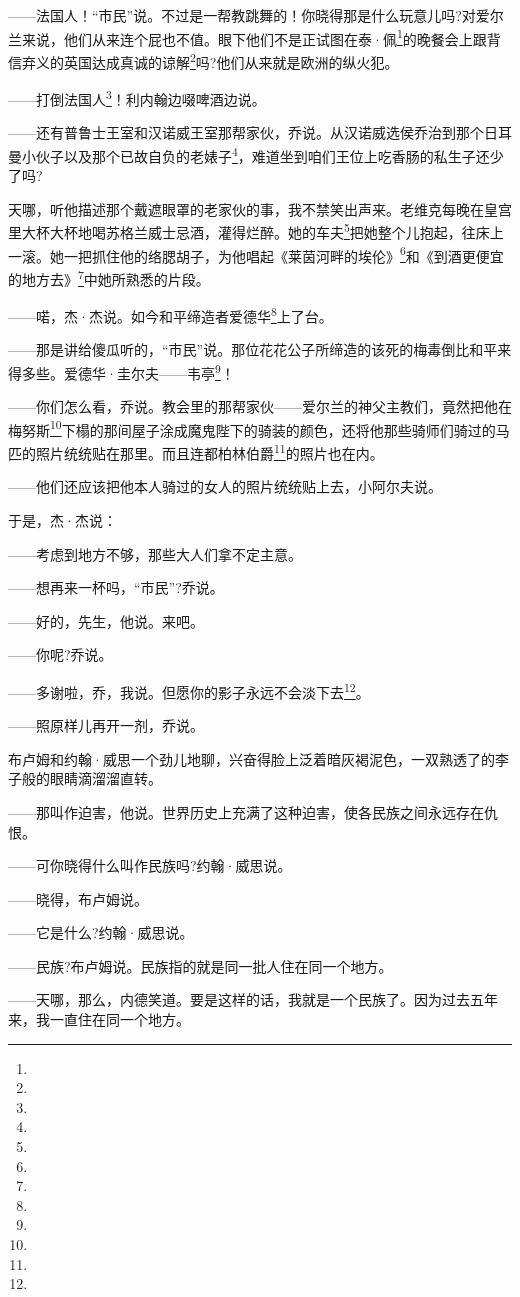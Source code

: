 \par ——法国人！“市民”说。不过是一帮教跳舞的！你晓得那是什么玩意儿吗?对爱尔兰来说，他们从来连个屁也不值。眼下他们不是正试图在泰·佩\footnote{}的晚餐会上跟背信弃义的英国达成真诚的谅解\footnote{}吗?他们从来就是欧洲的纵火犯。
\par ——打倒法国人\footnote{}！利内翰边啜啤酒边说。
\par ——还有普鲁士王室和汉诺威王室那帮家伙，乔说。从汉诺威选侯乔治到那个日耳曼小伙子以及那个已故自负的老婊子\footnote{}，难道坐到咱们王位上吃香肠的私生子还少了吗?
\par 天哪，听他描述那个戴遮眼罩的老家伙的事，我不禁笑出声来。老维克每晚在皇宫里大杯大杯地喝苏格兰威士忌酒，灌得烂醉。她的车夫\footnote{}把她整个儿抱起，往床上一滚。她一把抓住他的络腮胡子，为他唱起《莱茵河畔的埃伦》\footnote{}和《到酒更便宜的地方去》\footnote{}中她所熟悉的片段。
\par ——喏，杰·杰说。如今和平缔造者爱德华\footnote{}上了台。
\par ——那是讲给傻瓜听的，“市民”说。那位花花公子所缔造的该死的梅毒倒比和平来得多些。爱德华·圭尔夫——韦亭\footnote{}！
\par ——你们怎么看，乔说。教会里的那帮家伙——爱尔兰的神父主教们，竟然把他在梅努斯\footnote{}下榻的那间屋子涂成魔鬼陛下的骑装的颜色，还将他那些骑师们骑过的马匹的照片统统贴在那里。而且连都柏林伯爵\footnote{}的照片也在内。
\par ——他们还应该把他本人骑过的女人的照片统统贴上去，小阿尔夫说。
\par 于是，杰·杰说：
\par ——考虑到地方不够，那些大人们拿不定主意。
\par ——想再来一杯吗，“市民”?乔说。
\par ——好的，先生，他说。来吧。
\par ——你呢?乔说。
\par ——多谢啦，乔，我说。但愿你的影子永远不会淡下去\footnote{}。
\par ——照原样儿再开一剂，乔说。
\par 布卢姆和约翰·威思一个劲儿地聊，兴奋得脸上泛着暗灰褐泥色，一双熟透了的李子般的眼睛滴溜溜直转。
\par ——那叫作迫害，他说。世界历史上充满了这种迫害，使各民族之间永远存在仇恨。
\par ——可你晓得什么叫作民族吗?约翰·威思说。
\par ——晓得，布卢姆说。
\par ——它是什么?约翰·威思说。
\par ——民族?布卢姆说。民族指的就是同一批人住在同一个地方。
\par ——天哪，那么，内德笑道。要是这样的话，我就是一个民族了。因为过去五年来，我一直住在同一个地方。
